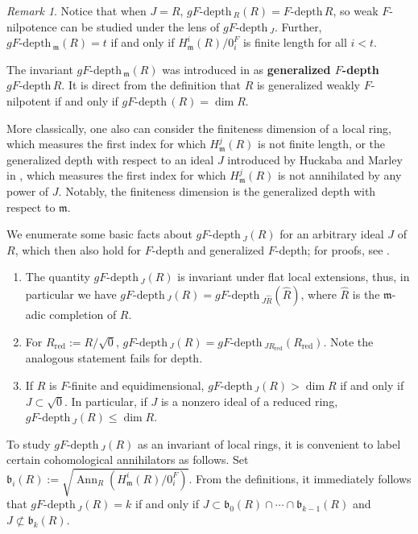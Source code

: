 \documentclass{amsproc}
\theoremstyle{definition}
\theoremstyle{remark}
\newtheorem{remark}[theorem]{Remark}
\numberwithin{equation}{section}
\newcommand{\fm}{\mathfrak{m}}
\newcommand{\fb}{\mathfrak{b}}
\newcommand{\Ann}{\operatorname{Ann}}
\newcommand{\fdp}{F\text{-depth}\,}
\newcommand{\gfdp}{gF\text{-depth}\,}
\begin{document}
\begin{remark} 
Notice that when $J=R$, $\gfdp_R(R) = \fdp R$, so weak $F$-nilpotence can be studied under the lens of $\gfdp_J$. Further, $\gfdp_\fm(R) = t$ if and only if $H_\fm^i(R)/0_i^F$ is finite length for all $i < t$. 

The invariant $\gfdp_\fm(R)$ was introduced in \cite{MM24} as {\bf generalized $F$-depth} $\gfdp R$. It is direct from the definition that $R$ is generalized weakly $F$-nilpotent if and only if $\gfdp(R) = \dim R$. 
\end{remark}

More classically, one also can consider the finiteness dimension of a local ring, which measures the first index for which $H^j_\fm(R)$ is not finite length, or the generalized depth with respect to an ideal $J$ introduced by Huckaba and Marley in \cite{HM94}, which measures the first index for which $H^j_\fm(R)$ is not annihilated by any power of $J$. Notably, the finiteness dimension is the generalized depth with respect to $\fm$. 

We enumerate some basic facts about $\gfdp_J(R)$ for an arbitrary ideal $J$ of $R$, which then also hold for $F$-depth and generalized $F$-depth; for proofs, see \cite[Thm. 3.8, Thm. 3.10]{CMM23}.
\begin{enumerate}
\item The quantity $\gfdp_J(R)$ is invariant under flat local extensions, thus, in particular we have $\gfdp_J(R) = \gfdp_{J\widehat{R}}(\widehat{R})$, where $\widehat{R}$ is the $\fm$-adic completion of $R$.
\item For $R_{\textrm{red}} := R/\sqrt{0}$, $\gfdp_J(R) = \gfdp_{JR_\textrm{red}}(R_{\textrm{red}})$. Note the analogous statement fails for depth. 
\item If $R$ is $F$-finite and equidimensional, $\gfdp_J(R) > \dim R$ if and only if $J \subset \sqrt{0}$. In particular, if $J$ is a nonzero ideal of a reduced ring, $\gfdp_J(R) \le \dim R$.
\end{enumerate}


To study $\gfdp_J(R)$ as an invariant of local rings, it is convenient to label certain cohomological annihilators as follows. Set $\fb_i(R) := \sqrt{ \Ann_R\left(H_\fm^i(R)/0^F_i\right) }$. From the definitions, it immediately follows that $\gfdp_J(R) = k$ if and only if $J \subset \fb_0(R) \cap \cdots \cap \fb_{k-1}(R)$ and $J \not\subset \fb_k(R)$. 
\end{document}
